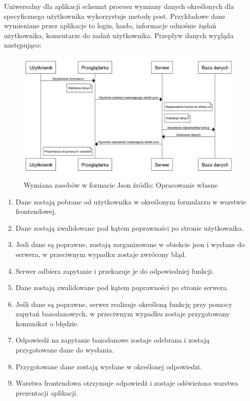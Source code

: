 \documentclass[12pt]{report}
\begin{document}
 Uniwersalny dla aplikacji schemat procesu wymiany danych określonych dla specyficznego użytkownika wykorzystuje metodę post. Przykładowe dane wymieniane przez aplikacje to login, hasło, informacje odnośnie żądań użytkownika, komentarze do zadań użytkownika. Przepływ danych wygląda następująco:
 \begin{figure}[!hb]
\centering
\includegraphics[width=\textwidth,height=\textheight,keepaspectratio]{U-P-S-B.png} 
\caption{Wymiana zasobów w formacie Json źródlo: Opracowanie własne}
\end{figure}
\begin{enumerate}
\item Dane zostają pobrane od użytkownika w określonym formularzu w warstwie frontendowej.
\item Dane zostają zwalidowane pod kątem poprawności po stronie użytkownika.
\item Jesli dane są poprawne, zostają zorganizowane w obiekcie json i wysłane do serwera, w przeciwnym wypadku zostaje zwrócony błąd.
\item Serwer odbiera zapytanie i przekazuje je do odpowiedniej funkcji.
\item Dane zostają zwalidowane pod kątem poprawności po stronie serwera.
\item Jeśli dane są poprawne, serwer realizuje określoną funkcję przy pomocy zapytań bazodanowych, w przeciwnym wypadku zostaje przygotowany komunikat o błędzie.
\item Odpowiedź na zapytanie bazodanowe zostaje odebrana i zostają przygotowane dane do wysłania.
\item Przygotowane dane zostają wysłane w określonej odpowiedzi.
\item Warstwa frontendowa otrzymuje odpowiedź i zostaje odświeżona warstwa prezentacji aplikacji.
\end{enumerate}
 
\end{document}
